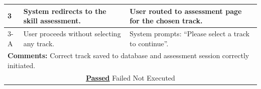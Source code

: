\documentclass{FastFyp}
\begin{document}
\begin{table}[H]
\begin{tabular}{|p{2.5cm}|p{4cm}|p{2.5cm}|p{4.5cm}|}
3 & System redirects to the skill assessment. & \multicolumn{2}{p{7cm}|}{User routed to assessment page for the chosen track.} \\ \hline
3-A & User proceeds without selecting any track. & \multicolumn{2}{p{7cm}|}{System prompts: ``Please select a track to continue''.} \\ \hline
\multicolumn{4}{|p{13.5cm}|}{\textbf{Comments:} Correct track saved to database and assessment session correctly initiated.} \\ \hline
\multicolumn{4}{|c|}{\underline{\textbf{Passed}} \quad\quad\quad Failed \quad\quad\quad Not Executed} \\ \hline
\end{tabular}
\end{table}

\vspace{0.5em}
\end{document}

